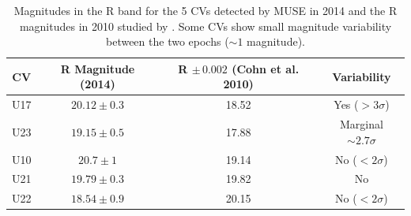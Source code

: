 
\begin{table}[]
\centering
\begin{tabular}{|c|c|c|c|}
\hline
\textbf{CV} & \textbf{R Magnitude (2014)} & \textbf{R $\mathbf{\pm \, 0.002}$ (Cohn et al. 2010)} & \textbf{Variability}\\ \hline
U17         & $20.12 \pm 0.3$                       & 18.52  & Yes ($> 3 \sigma$)\\ \hline
U23         & $19.15 \pm 0.5$                      & 17.88  & Marginal $\sim 2.7 \sigma$                    \\ \hline
U10         & $20.7 \pm 1 $                        & 19.14 & No ($< 2 \sigma$)          \\ \hline
U21         & $19.79 \pm 0.3$                   & 19.82 & No \\ \hline
U22         & $18.54 \pm 0.9 $                       & 20.15 & No ($< 2 \sigma$)                              \\ \hline

\end{tabular}
   \caption{Magnitudes in the R band for the 5 CVs detected by MUSE in 2014 and the R magnitudes in 2010 studied by \cite{cohn_identification_2010}. Some CVs show small magnitude variability between the two epochs ($\sim 1$ magnitude).}
    \label{tab:truthTables}   
\end{table}


